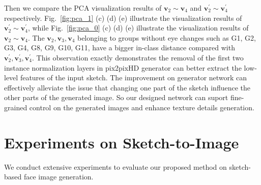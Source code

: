 \documentclass[10pt,twocolumn,letterpaper]{article}
\begin{document}

Then we compare the PCA visualization results of $\boldsymbol{v}_2\sim\boldsymbol{v}_4$ and $\boldsymbol{v}_2^{'}\sim\boldsymbol{v}_4^{'}$ respectively.
% 
Fig.~\ref{fig:pca_1} (c) (d) (e) illustrate the visualization results of $\boldsymbol{v}_2^{'}\sim\boldsymbol{v}_4^{'}$, while Fig.~\ref{fig:pca_0} (c) (d) (e) illustrate the visualization results of $\boldsymbol{v}_2\sim\boldsymbol{v}_4$. 
The $\boldsymbol{v}_2, \boldsymbol{v}_3, \boldsymbol{v}_4$ belonging to groups without eye changes such as G1, G2, G3, G4, G8, G9, G10, G11, have a bigger in-class distance compared with $\boldsymbol{v}_2^{'}, \boldsymbol{v}_3^{'}, \boldsymbol{v}_4^{'}$. 
This observation exactly demonstrates the removal of the first two instance normalization layers in pix2pixHD generator can better extract the low-level features of the input sketch. 
The improvement on generator network can effectively alleviate the issue that changing one part of the sketch influence the other parts of the generated image. So our designed network can suport fine-grained control on the generated images and enhance texture details generation.


\section{Experiments on Sketch-to-Image}
We conduct extensive experiments to evaluate our proposed method on sketch-based face image generation.
\end{document}
